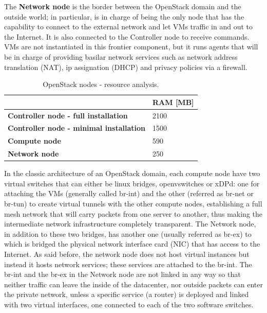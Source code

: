 The \textbf{Network node} is the border between the OpenStack domain and the outside world; in particular, is in charge of being the only node that has the capability to connect to the external network and let VMs traffic in and out to the Internet. It is also connected to the Controller node to receive commands. VMs are not instantiated in this frontier component, but it runs agents that will be in charge of providing basilar network services such as network address translation (NAT), ip assignation (DHCP) and privacy policies via a firewall.
\begin{table}[h]
\begin{tabular}{l|l|}
\cline{2-2}
                                                          & RAM {[}MB{]} \\ \hline
\multicolumn{1}{|l|}{\textbf{Controller node - full installation}} & 2100         \\ \hline
\multicolumn{1}{|l|}{\textbf{Controller node - minimal installation}}                                   & 1500         \\ \hline
\multicolumn{1}{|l|}{\textbf{Compute node}}                                   & 590          \\ \hline
\multicolumn{1}{|l|}{\textbf{Network node}}                                   & 250          \\ \hline
\end{tabular}
\centering
\caption{OpenStack nodes - resource analysis.}
\label{tbl:components_resource_usage2}
\end{table}

\label{a:br_section}
In the classic architecture of an OpenStack domain, each compute node have two virtual switches that can either be linux bridges, openvswitches\cite{ovswebsite} or xDPd\cite{xdpdwebsite}: one for attaching the VMs (generally called br-int) and the other (referred as br-net or br-tun) to create virtual tunnels with the other compute nodes, establishing a full mesh network that will carry packets from one server to another, thus making the intermediate network infrastructure completely transparent. The Network node, in addition to these two bridges, has another one (usually referred as br-ex) to which is bridged the physical network interface card (NIC) that has access to the Internet. As said before, the network node does not host virtual instances but instead it hosts network services; these services are attached to the br-int.
The br-int and the br-ex in the Network node are not linked in any way so that neither traffic can leave the inside of the datacenter, nor outside packets can enter the private network, unless a specific service (a router) is deployed and linked with two virtual interfaces, one connected to each of the two software switches.

